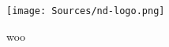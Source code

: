 \documentclass[]{article}
\newenvironment{lfigure}{\begin{landscape}\begin{figure}}{\end{figure}\end{landscape}}
\begin{document}
\begin{lfigure}
[h!]
\texttt{[image: Sources/nd-logo.png]}
\caption{woo}
\label{yeah}
\end{lfigure}
\end{document}
